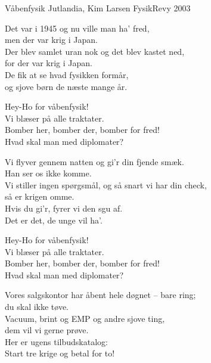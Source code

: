 \begin{song}{Våbenfysik}{}
  {Jutlandia, Kim Larsen}
  {}
  {FysikRevy 2003}
  {\NotCCLIed}

  \begin{SBVerse}
	Det var i 1945 og nu ville man ha’ fred,\\
	men der var krig i Japan.\\
	Der blev samlet uran nok og det blev kastet ned,\\
	for der var krig i Japan.\\
	De fik at se hvad fysikken formår,\\
	og sjove børn de næste mange år.
  \end{SBVerse}

  \begin{SBChorus}
	Hey-Ho for våbenfysik!\\
	Vi blæser på alle traktater.\\
	Bomber her, bomber der, bomber for fred!\\
	Hvad skal man med diplomater?
  \end{SBChorus}

  \begin{SBVerse}
	Vi flyver gennem natten og gi’r din fjende smæk.\\
	Han ser os ikke komme.\\
	Vi stiller ingen spørgsmål, og så snart vi har din check,\\
	så er krigen omme.\\
	Hvis du gi’r, fyrer vi den sgu af.\\
	Det er det, de unge vil ha’.
  \end{SBVerse}

  \begin{SBChorus}
	Hey-Ho for våbenfysik!\\
	Vi blæser på alle traktater.\\
	Bomber her, bomber der, bomber for fred!\\
	Hvad skal man med diplomater?
  \end{SBChorus}


  \begin{SBVerse}
	Vores salgskontor har åbent hele døgnet – bare ring;\\
	du skal ikke tøve.\\
	Vacuum, brint og EMP og andre sjove ting,\\
	dem vil vi gerne prøve.\\
	Her er ugens tilbudskatalog:\\
	Start tre krige og betal for to!
  \end{SBVerse}


\end{song}
